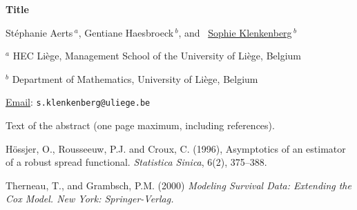 \documentclass[12pt]{article}
\begin{document}
\begin{center}
\Large \bf Title \rm

\vspace{1cm}


\large Stéphanie Aerts$\,^a$, \large  Gentiane Haesbroeck$\,^b$, \large and \,  \underline{Sophie Klenkenberg}$\,^b$

\vspace{0.5cm}

\normalsize


$^a$ HEC Liège, Management School of the University of Li\`ege, Belgium

$^b$ Department of Mathematics, University of Li\`ege, Belgium


\vspace{5mm}
\underline{Email}: {\tt s.klenkenberg@uliege.be}


\vspace{1cm}

\end{center}


Text of the abstract (one page maximum, including references).


\begin{thebibliography}{60}

 H\"ossjer, O.,  Rousseeuw, P.J. and Croux, C. (1996),
     Asymptotics of an estimator of a robust spread functional.
     {\it Statistica Sinica}, 6(2), 375--388.

 Therneau, T., and Grambsch, P.M. (2000) \it Modeling Survival Data: Extending the Cox Model\rm. New York: Springer-Verlag.

\end{thebibliography}
\end{document}
